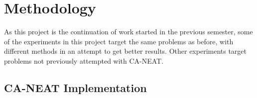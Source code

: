 \chapter{Methodology}
\label{chap:methodology}

As this project is the continuation of work started in the previous semester,
some of the experiments in this project target the same problems as before,
with different methods in an attempt to get better results.
Other experiments target problems not previously attempted with CA-NEAT.

\section{CA-NEAT Implementation}
\label{sec:implementation}




